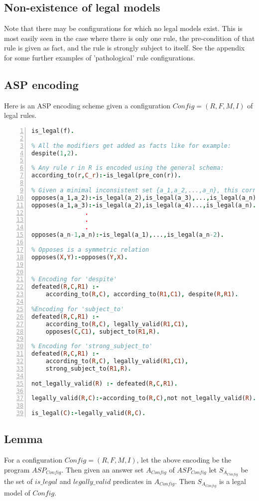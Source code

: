 \subsection{Non-existence of legal models}
Note that there may be configurations for which no legal models exist. This is most easily seen in the case where there is only one rule, the pre-condition of that rule is given as fact, and the rule is strongly subject to itself. See the appendix for some further examples of 'pathological' rule configurations.

\subsection{ASP encoding}
Here is an ASP encoding scheme given a configuration $Config = (R,F,M,I)$ of legal rules.
\begin{lstlisting}[language=Prolog, numbers=left]
% For any f in F, we have:
is_legal(f). 

% All the modifiers get added as facts like for example:
despite(1,2).

% Any rule r in R is encoded using the general schema:
according_to(r,C_r):-is_legal(pre_con(r)).

% Given a minimal inconsistent set {a_1,a_2,...,a_n}, this corresponds to a set of rules:
opposes(a_1,a_2):-is_legal(a_2),is_legal(a_3),...,is_legal(a_n).
opposes(a_1,a_3):-is_legal(a_2),is_legal(a_4)...,is_legal(a_n).
               .
               .
               .
opposes(a_n-1,a_n):-is_legal(a_1),...,is_legal(a_n-2).               

% Opposes is a symmetric relation
opposes(X,Y):-opposes(Y,X).


% Encoding for 'despite'
defeated(R,C,R1) :-
    according_to(R,C), according_to(R1,C1), despite(R,R1).

%Encoding for 'subject_to'
defeated(R,C,R1) :-
    according_to(R,C), legally_valid(R1,C1),
    opposes(C,C1), subject_to(R1,R).

% Encoding for 'strong_subject_to'
defeated(R,C,R1) :-
    according_to(R,C), legally_valid(R1,C1),
    strong_subject_to(R1,R).

not_legally_valid(R) :- defeated(R,C,R1).

legally_valid(R,C):-according_to(R,C),not not_legally_valid(R).

is_legal(C):-legally_valid(R,C).
\end{lstlisting}
\subsection{Lemma}
For a configuration $Config=(R,F,M,I)$, let the above encoding be the program $ASP_{Config}$. Then given an answer set $A_{Config}$ of $ASP_{Config}$ let $S_{A_{Config}}$ be the set of $is\_legal$ and $legally\_valid$ predicates in $A_{Config}$. Then $S_{A_{Config}}$ is a legal model of $Config$.    

